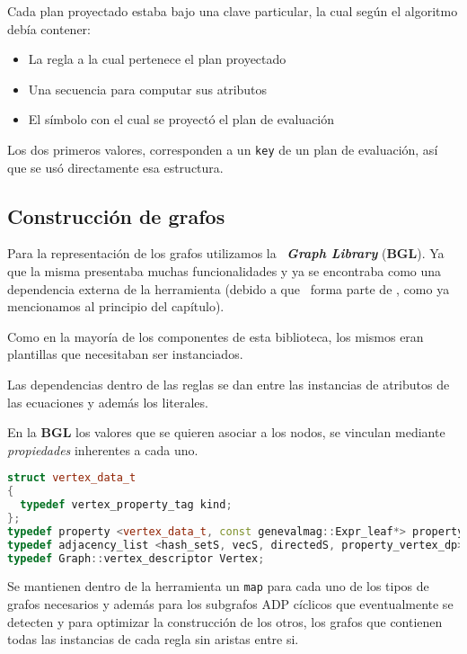 Cada plan proyectado estaba bajo una clave particular, la cual según el algoritmo debía contener:
\begin{itemize}
\item La regla a la cual pertenece el plan proyectado
\item Una secuencia para computar sus atributos
\item El símbolo con el cual se proyectó el plan de evaluación
\end{itemize}

Los dos primeros valores, corresponden a un \texttt{key} de un plan de evaluación, así que se usó directamente esa estructura.

\subsection{Construcción de grafos}
\label{subsec:const-graf}
Para la representación de los grafos utilizamos la \boost\ \textit{\textbf{Graph Library}} (\textbf{BGL}). Ya que la misma presentaba muchas funcionalidades y ya se encontraba como una dependencia externa de la herramienta (debido a que \spirit\ forma parte de \boost, como ya mencionamos al principio del capítulo).

Como en la mayoría de los componentes de esta biblioteca, los mismos eran plantillas que necesitaban ser instanciados.

Las dependencias dentro de las reglas se dan entre las instancias de atributos de las ecuaciones y además los literales.

En la \textbf{BGL} los valores que se quieren asociar a los nodos, se vinculan mediante \textit{propiedades} inherentes a cada uno.

\begin{lstlisting}[language=C++, basicstyle=\scriptsize, columns=fullflexible, linewidth=13cm]
struct vertex_data_t
{
  typedef vertex_property_tag kind;
};
typedef property <vertex_data_t, const genevalmag::Expr_leaf*> property_vertex_dp;
typedef adjacency_list <hash_setS, vecS, directedS, property_vertex_dp> Graph;
typedef Graph::vertex_descriptor Vertex;
\end{lstlisting}

Se mantienen dentro de la herramienta un \texttt{map} para cada uno de los tipos de grafos necesarios y además para los subgrafos ADP cíclicos que eventualmente se detecten y para optimizar la construcción de los otros, los grafos que contienen todas las instancias de cada regla sin aristas entre si.

